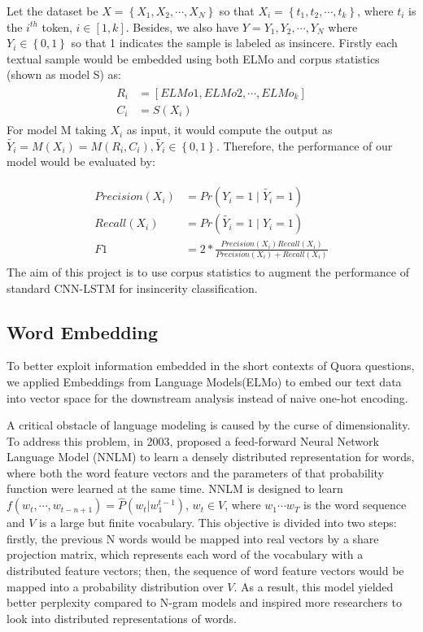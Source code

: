 \documentclass[12pt]{diazessay} %
\begin{document}
{Let the dataset be $X = \left \{ X_1, X_2,\cdots, X_N \right \}$ so that $X_i = \left \{ t_1, t_2,\cdots, t_k \right \}$, where $t_i$ is the $i^{th}$ token, $i\in [1,k]$. Besides, we also have $Y={Y_1, Y_2,\cdots,Y_N}$ where $Y_i\in\left\{ 0, 1 \right\}$ so that 1 indicates the sample is labeled as  insincere. Firstly each textual sample would be embedded using both ELMo and corpus statistics (shown as model S) as:
\begin{align} 
\begin{split}
   R_i &= [ELMo1, ELMo2,\cdots,ELMo_k]\\
   C_i &= S(X_i)
\end{split}         
\end{align}
For model M taking $X_i$ as input, it would compute the output as $\widetilde{Y_i} = M(X_i) = M(R_i, C_i), \widetilde{Y_i} \in \left\{ 0, 1 \right\}$. Therefore, the performance of our model would be evaluated by:

\begin{align} 
\begin{split}
   Precision(X_i) &= Pr(Y_i=1 \mid \widetilde{Y_i}=1) \\
   Recall(X_i) &= Pr(\widetilde{Y_i}=1 \mid Y_i=1) \\ 
   F1 & = 2 * \frac{Precision(X_i) Recall(X_i)}{Precision(X_i) + Recall(X_i)}
\end{split}         
\end{align}
The aim of this project is to use corpus statistics to augment the performance of standard CNN-LSTM for insincerity classification.


\subsection{Word Embedding}

To better exploit information embedded in the short contexts of Quora questions, we applied Embeddings from Language Models(ELMo) to embed our text data into vector space for the downstream analysis instead of naive one-hot encoding.

A critical obstacle of language modeling is caused by the curse of dimensionality. To address this problem, in 2003, \citet{bengio2003neural} proposed a feed-forward Neural Network Language Model (NNLM) to learn a densely distributed representation\citep{hinton1986learning} for words, where both the word feature vectors and the parameters of that probability function were learned at the same time. NNLM is designed to learn $f \left( w _ { t } , \cdots , w _ { t - n + 1 } \right) = \hat { P } \left( w _ { t } | w _ { 1 } ^ { t - 1 } \right)$, $w _ { t } \in V$, where $w_1 \cdots w_T$ is the word sequence and $V$ is a large but finite vocabulary. This objective is divided into two steps: firstly, the previous N words would be mapped into real vectors by a share projection matrix, which represents each word of the vocabulary with a distributed feature vectors; then, the sequence of word feature vectors would be mapped into a probability distribution over $V$. As a result, this model yielded better perplexity compared to N-gram models and inspired more researchers to look into distributed representations of words.

}
\end{document}
